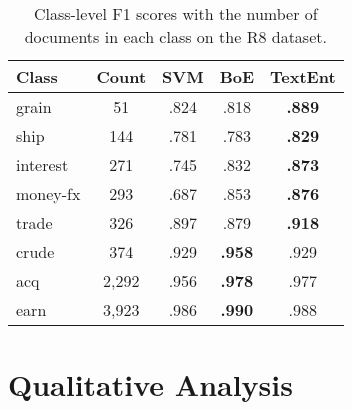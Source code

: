 \documentclass[11pt]{article}
\begin{document}
  \begin{table}[t]
    \centering
    \setlength\tabcolsep{6pt}
    \begin{tabular}{l|c|ccc}
      Class    & Count  & SVM  & BoE  & TextEnt\\
      \hline
      grain    & 51     & .824 &         .818  & \textbf{.889} \\
      ship     & 144    & .781 &         .783  & \textbf{.829} \\
      interest & 271    & .745 &         .832  & \textbf{.873} \\
      money-fx & 293    & .687 &         .853  & \textbf{.876} \\
      trade    & 326    & .897 &         .879  & \textbf{.918} \\
      crude    & 374    & .929 & \textbf{.958} &         .929 \\
      acq      & 2,292  & .956 & \textbf{.978} &         .977 \\
      earn     & 3,923  & .986 & \textbf{.990} &         .988 \\
\end{tabular}
    \caption{Class-level F1 scores with the number of documents in each class on the R8 dataset.}
    \label{tb:r8-class-level-results}
  \end{table}


  \section{Qualitative Analysis}
\end{document}
